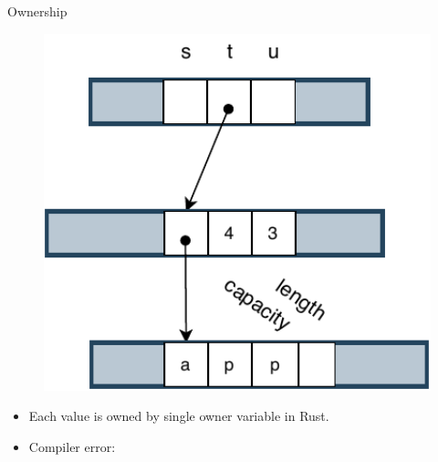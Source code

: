 \documentclass[9pt]{beamer}
\begin{document}
\begin{frame}[t, fragile]{Ownership}
\begin{minipage}{0.3\linewidth}
\begin{figure}[hp]
            \end{figure}
        \end{minipage}     
        \begin{minipage}{0.3\linewidth}
            \begin{figure}[hp]
                \centering
                \begin{center}
                        \includegraphics[width=1.0\textwidth]{images/owner2.pdf}
                        \captionsetup{labelformat=empty}
                \end{center}
                
            \end{figure}
        \end{minipage}
                

        \vspace{0.5cm}
        \begin{itemize}
            \item Each value is owned by single owner variable in Rust.
            \item Compiler error: 
        \end{itemize}

 \end{frame}
\end{document}
